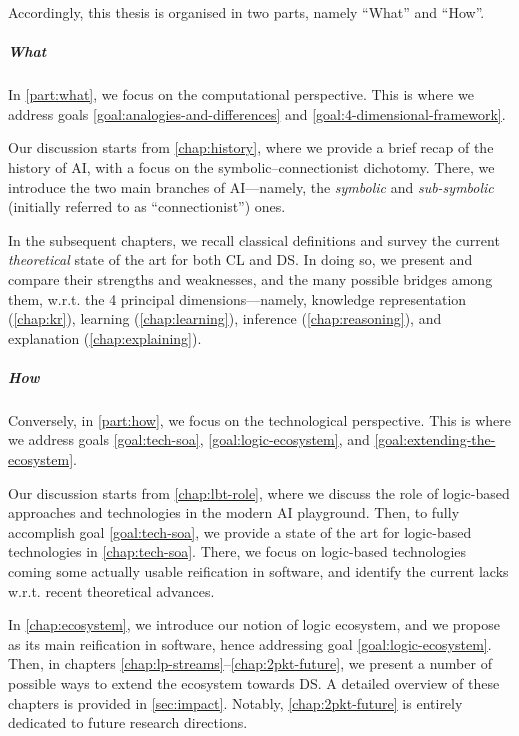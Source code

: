 \documentclass[12pt,a4paper,openright,twoside]{book}
\begin{document}
Accordingly, this thesis is organised in two parts, namely ``What'' and ``How''. %

\subparagraph{What}

In \cref{part:what}, %
we focus on the computational perspective.
%
This is where we address goals \ref{goal:analogies-and-differences} and \ref{goal:4-dimensional-framework}.

Our discussion starts from \cref{chap:history}, where we provide a brief recap of the history of AI, with a focus on the symbolic--connectionist dichotomy.
%
There, we introduce the two main branches of AI---namely, the \emph{symbolic} and \emph{sub-symbolic} (initially referred to as ``connectionist'') ones.

In the subsequent chapters, we recall classical definitions and survey the current \emph{theoretical} state of the art for both CL and DS.
%
In doing so, we present and compare their strengths and weaknesses, and the many possible bridges among them, w.r.t. the 4 principal dimensions---namely, knowledge representation (\cref{chap:kr}), learning (\cref{chap:learning}), inference (\cref{chap:reasoning}), and explanation (\cref{chap:explaining}).

\subparagraph{How}

Conversely, in \cref{part:how}, %
we focus on the technological perspective.
%
This is where we address goals \ref{goal:tech-soa}, \ref{goal:logic-ecosystem}, and \ref{goal:extending-the-ecosystem}.

Our discussion starts from \cref{chap:lbt-role}, where we discuss the role of logic-based approaches and technologies in the modern AI playground.
%
Then, to fully accomplish goal \ref{goal:tech-soa}, we provide a state of the art for logic-based technologies in \cref{chap:tech-soa}.
%
There, we focus on logic-based technologies coming some actually usable reification in software, and identify the current lacks w.r.t. recent theoretical advances.

In \cref{chap:ecosystem}, we introduce our notion of logic ecosystem, and we propose \twopkt{} as its main reification in software, hence addressing goal \ref{goal:logic-ecosystem}.
%
Then, in chapters \ref{chap:lp-streams}--\ref{chap:2pkt-future}, we present a number of possible ways to extend the \twopkt{} ecosystem towards DS.
%
A detailed overview of these chapters is provided in \cref{sec:impact}.
%
Notably, \cref{chap:2pkt-future} is entirely dedicated to future research directions.
\end{document}
